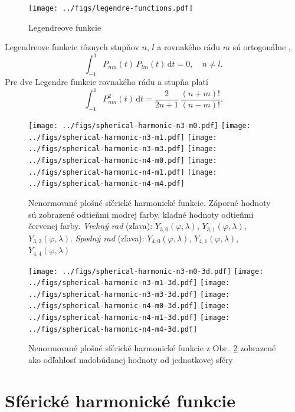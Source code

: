\documentclass[a4paper, 12pt]{book}
\newcommand{\diff}{\mathrm d}
\begin{document}
\begin{figure}[bt]
\label{fig:lf}
\centering
\texttt{[image: ../figs/legendre-functions.pdf]}
\caption{Legendreove funkcie}
\end{figure}

Legendreove funkcie rôznych stupňov $n$, $l$ a rovnakého rádu $m$ sú 
ortogonálne \citep{Freeden2009},
%
\begin{equation}
\int_{-1}^{1} P_{nm}(t) \, P_{lm}(t) \, \diff t = 0{,} \quad n \neq l{.}
\end{equation}
%
Pre dve Legendre funkcie rovnakého rádu a stupňa platí
\begin{equation}
\int_{-1}^{1} P^2_{nm}(t) \, \diff t = \frac{2}{2n + 1} \, \frac{(n + m)!}{(n 
- m)!}{.}
\end{equation}


\begin{figure}[bt]
\centering
\texttt{[image: ../figs/spherical-harmonic-n3-m0.pdf]}
\texttt{[image: ../figs/spherical-harmonic-n3-m1.pdf]}
\texttt{[image: ../figs/spherical-harmonic-n3-m3.pdf]}
\texttt{[image: ../figs/spherical-harmonic-n4-m0.pdf]}
\texttt{[image: ../figs/spherical-harmonic-n4-m1.pdf]}
\texttt{[image: ../figs/spherical-harmonic-n4-m4.pdf]}
\caption{Nenormované plošné sférické harmonické funkcie.  Záporné hodnoty sú 
zobrazené odtieňmi modrej farby, kladné hodnoty odtieňmi červenej farby.  
\textit{Vrchný rad} (zľava): $Y_{3,0}(\varphi, \lambda)$, $Y_{3,1}(\varphi, 
\lambda)$, $Y_{3,3}(\varphi, \lambda)$.  \textit{Spodný rad} (zľava): 
$Y_{4,0}(\varphi, \lambda)$, $Y_{4,1}(\varphi, \lambda)$, $Y_{4,4}(\varphi, 
\lambda)$}
\label{fig:sh}
\end{figure}


\begin{figure}[bt]
\centering
\texttt{[image: ../figs/spherical-harmonic-n3-m0-3d.pdf]}
\texttt{[image: ../figs/spherical-harmonic-n3-m1-3d.pdf]}
\texttt{[image: ../figs/spherical-harmonic-n3-m3-3d.pdf]}
\texttt{[image: ../figs/spherical-harmonic-n4-m0-3d.pdf]}
\texttt{[image: ../figs/spherical-harmonic-n4-m1-3d.pdf]}
\texttt{[image: ../figs/spherical-harmonic-n4-m4-3d.pdf]}
\caption{Nenormované plošné sférické harmonické funkcie z Obr.~\ref{fig:sh} 
zobrazené ako odľahlosť nadobúdanej hodnoty od jednotkovej sféry}
\label{fig:sh3d}
\end{figure}



\section{Sférické harmonické funkcie}
\label{sec:spherical_harmonics}
\end{document}
